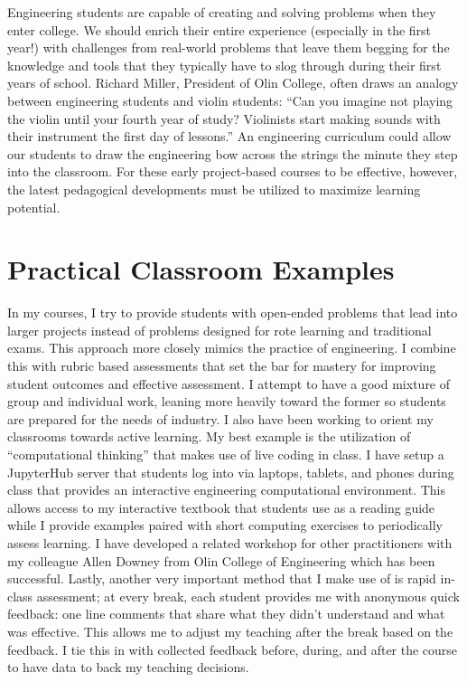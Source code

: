 \documentclass{article}
\begin{document}
Engineering students are capable of creating and solving problems when they
enter college. We should enrich their entire experience (especially in the first
year!) with challenges from real-world problems that leave them begging for the
knowledge and tools that they typically have to slog through during their first
years of school. Richard Miller, President of Olin College, often draws an
analogy between engineering students and violin students: ``Can you imagine not
playing the violin until your fourth year of study? Violinists start making
sounds with their instrument the first day of lessons.'' An engineering
curriculum could allow our students to draw the engineering bow across the
strings the minute they step into the classroom. For these early project-based
courses to be effective, however, the latest pedagogical developments must be
utilized to maximize learning potential.

\section*{Practical Classroom Examples}
%
In my courses, I try to provide students with open-ended problems that
lead into larger projects instead of problems designed for rote learning and
traditional exams. This approach more closely mimics the practice of
engineering. I combine this with rubric based assessments that set the bar for
mastery for improving student outcomes and effective assessment. I attempt to
have a good mixture of group and individual work, leaning more heavily toward
the former so students are prepared for the needs of industry. I also have been
working to orient my classrooms towards active learning. My best example is the
utilization of ``computational thinking'' that makes use of live coding in
class. I have setup a JupyterHub server that students log into via laptops,
tablets, and phones during class that provides an interactive engineering
computational environment. This allows access to my interactive textbook that
students use as a reading guide while I provide examples paired with short
computing exercises to periodically assess learning. I have developed a related
workshop for other practitioners with my colleague Allen Downey from Olin
College of Engineering which has been successful. Lastly, another very
important method that I make use of is rapid in-class assessment; at every
break, each student provides me with anonymous quick feedback: one line
comments that share what they didn't understand and what was effective. This
allows me to adjust my teaching after the break based on the feedback. I tie
this in with collected feedback before, during, and after the course to have
data to back my teaching decisions.
\end{document}
